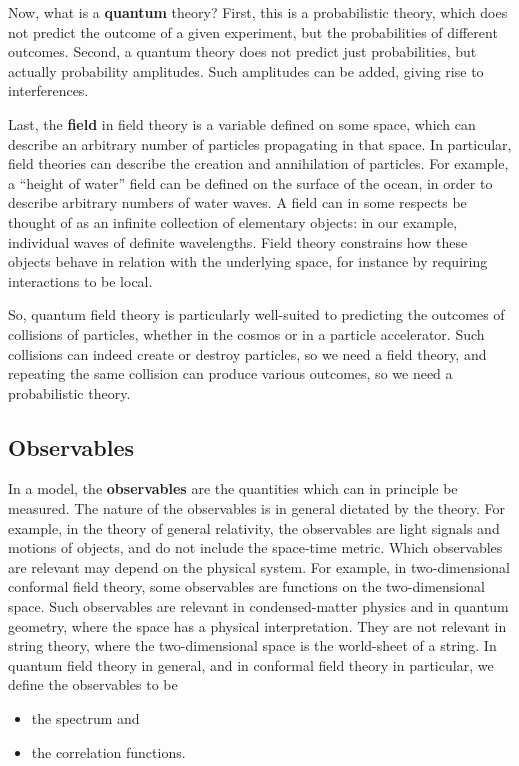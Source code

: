 \documentclass[12pt,a4paper,notitlepage]{report}
\numberwithin{equation}{section}
\theoremstyle{break}
\begin{document}
Now, what is a \textbf{\boldmath quantum} theory? First, this is a probabilistic theory, which does not predict the outcome of a given experiment, but the probabilities of different outcomes.
Second, a quantum theory does not predict just probabilities, but actually probability amplitudes.
Such amplitudes can be added, giving rise to interferences. 

Last, the \textbf{\boldmath field} in field theory is a variable defined on some space, which can describe an arbitrary number of particles propagating in that space.
In particular, field theories can describe the creation and annihilation of particles.
For example, a ``height of water'' field can be defined on the surface of the ocean, in order to describe arbitrary numbers of water waves.
A field can in some respects be thought of as an infinite collection of elementary objects: in our example, individual waves of definite wavelengths.
Field theory constrains how these objects behave in relation with the underlying space, for instance by requiring interactions to be local.

So, quantum field theory is particularly well-suited to predicting the outcomes of collisions of particles, whether in the cosmos or in a particle accelerator.
Such collisions can indeed create or destroy particles, so we need a field theory, and repeating the same collision can produce various outcomes, so we need a probabilistic theory. 

\subsection{Observables}

In a model, the \textbf{\boldmath observables} are the quantities which can in principle be measured.
The nature of the observables is in general dictated by the theory.
For example, in the theory of general relativity, the observables are light signals and motions of objects, and do not include the space-time metric. 
Which observables are relevant may depend on the physical system.
For example, in two-dimensional conformal field theory, some observables are functions on the two-dimensional space.
Such observables are relevant in condensed-matter physics and in quantum geometry, where the space has a physical interpretation.
They are not relevant in string theory, where the two-dimensional space is the world-sheet of a string. 
In quantum field theory in general, and in conformal field theory in particular, we define the observables to be 
\begin{itemize}
 \item the spectrum and
\item the correlation functions.
\end{itemize}
\end{document}
